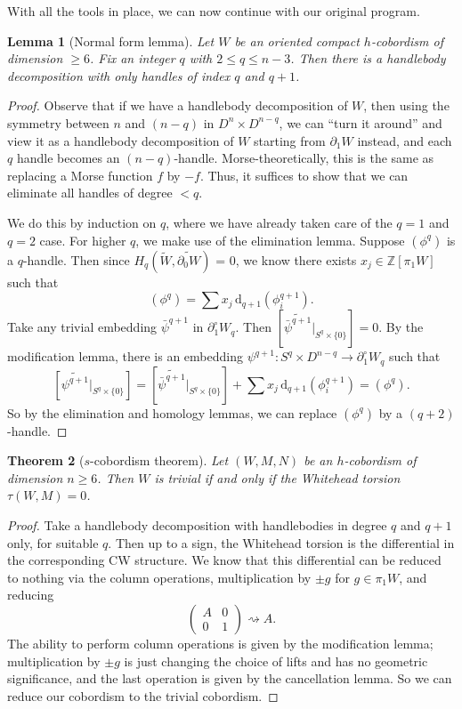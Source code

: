 \documentclass[a4paper, 12pt]{article}
\newtheorem{thm}{Theorem}[section]
\newtheorem{lemma}[thm]{Lemma}
\theoremstyle{definition}
\newcommand\Z{\mathbb{Z}}
\begin{document}
With all the tools in place, we can now continue with our original program.
\begin{lemma}[Normal form lemma]\label{lemma:normal-form}
  Let $W$ be an oriented compact $h$-cobordism of dimension $\geq 6$. Fix an integer $q$ with $2 \leq q \leq n - 3$. Then there is a handlebody decomposition with only handles of index $q$ and $q + 1$.
\end{lemma}

\begin{proof}
  Observe that if we have a handlebody decomposition of $W$, then using the symmetry between $n$ and $(n - q)$ in $D^n \times D^{n - q}$, we can ``turn it around'' and view it as a handlebody decomposition of $W$ starting from $\partial_1 W$ instead, and each $q$ handle becomes an $(n - q)$-handle. Morse-theoretically, this is the same as replacing a Morse function $f$ by $-f$. Thus, it suffices to show that we can eliminate all handles of degree $< q$.

  We do this by induction on $q$, where we have already taken care of the $q = 1$ and $q = 2$ case. For higher $q$, we make use of the elimination lemma. Suppose $(\phi^q)$ is a $q$-handle. Then since $H_q(\tilde{W}, \widetilde{\partial_0 W})$ = 0, we know there exists $x_j \in \Z[\pi_1 W]$ such that
  \[
    (\phi^q) = \sum x_j \,\mathrm{d}_{q + 1} (\phi_i^{q + 1}).
  \]
  Take any trivial embedding $\bar{\psi}^{q + 1}$ in $\partial_1^\circ W_q$. Then $[\widetilde{\bar{\psi}^{q + 1}}|_{S^q \times \{0\}}] = 0$. By the modification lemma, there is an embedding $\psi^{q + 1}: S^q \times D^{n - q} \to \partial_1^\circ W_q$ such that
  \[
    [\widetilde{\psi^{q + 1}}|_{S^q \times \{0\}}] = [\widetilde{\bar{\psi}^{q + 1}}|_{S^q \times \{0\}}] + \sum x_j \, \mathrm{d}_{q + 1} (\phi_i^{q + 1}) = (\phi^q).
  \]
  So by the elimination and homology lemmas, we can replace $(\phi^q)$ by a $(q + 2)$-handle.
\end{proof}

\begin{thm}[$s$-cobordism theorem]
  Let $(W, M, N)$ be an $h$-cobordism of dimension $n \geq 6$. Then $W$ is trivial if and only if the Whitehead torsion $\tau(W, M) = 0$.
\end{thm}

\begin{proof}
  Take a handlebody decomposition with handlebodies in degree $q$ and $q + 1$ only, for suitable $q$. Then up to a sign, the Whitehead torsion is the differential in the corresponding CW structure. We know that this differential can be  reduced to nothing via the column operations, multiplication by $\pm g$ for $g \in \pi_1 W$, and reducing
  \[
    \begin{pmatrix}
      A & 0\\
      0 & 1
    \end{pmatrix} \rightsquigarrow A.
  \]
  The ability to perform column operations is given by the modification lemma; multiplication by $\pm g$ is just changing the choice of lifts and has no geometric significance, and the last operation is given by the cancellation lemma. So we can reduce our cobordism to the trivial cobordism.
\end{proof}
\end{document}
